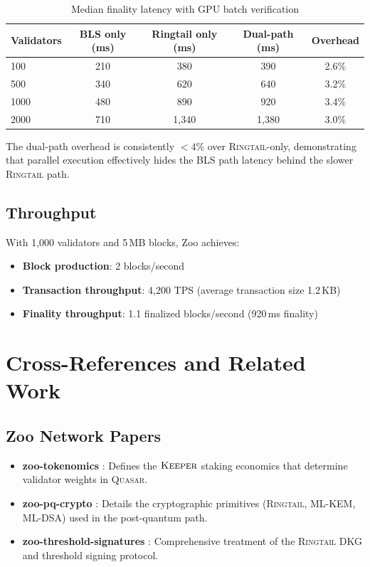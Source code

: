 \documentclass[11pt,letterpaper]{article}
\theoremstyle{definition}
\theoremstyle{remark}
\newcommand{\Quasar}{\textsc{Quasar}}
\newcommand{\Ringtail}{\textsc{Ringtail}}
\begin{document}
\begin{table}[h]
\centering
\begin{tabular}{lcccc}
\toprule
\textbf{Validators} & \textbf{BLS only (ms)} & \textbf{Ringtail only (ms)} & \textbf{Dual-path (ms)} & \textbf{Overhead} \\
\midrule
100 & 210 & 380 & 390 & 2.6\% \\
500 & 340 & 620 & 640 & 3.2\% \\
1000 & 480 & 890 & 920 & 3.4\% \\
2000 & 710 & 1,340 & 1,380 & 3.0\% \\
\bottomrule
\end{tabular}
\caption{Median finality latency with GPU batch verification}
\label{tab:finality}
\end{table}

The dual-path overhead is consistently $< 4\%$ over \Ringtail{}-only, demonstrating that parallel execution effectively hides the BLS path latency behind the slower \Ringtail{} path.

\subsection{Throughput}

With 1,000 validators and 5\,MB blocks, Zoo achieves:
\begin{itemize}
\item \textbf{Block production}: 2 blocks/second
\item \textbf{Transaction throughput}: 4,200 TPS (average transaction size 1.2\,KB)
\item \textbf{Finality throughput}: 1.1 finalized blocks/second (920\,ms finality)
\end{itemize}

\section{Cross-References and Related Work}

\subsection{Zoo Network Papers}

\begin{itemize}
\item \textbf{zoo-tokenomics} \cite{zoo-tokenomics}: Defines the $\textsc{Keeper}$ staking economics that determine validator weights in \Quasar{}.
\item \textbf{zoo-pq-crypto} \cite{zoo-pq-crypto}: Details the cryptographic primitives (\Ringtail{}, ML-KEM, ML-DSA) used in the post-quantum path.
\item \textbf{zoo-threshold-signatures} \cite{zoo-threshold-sigs}: Comprehensive treatment of the \Ringtail{} DKG and threshold signing protocol.
\end{itemize}
\end{document}
